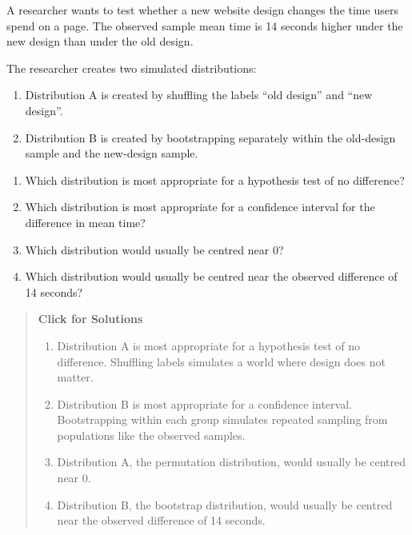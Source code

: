 \documentclass[
  letterpaper,
  DIV=11,
  numbers=noendperiod]{scrreprt}
\providecommand{\tightlist}{%
  \setlength{\itemsep}{0pt}\setlength{\parskip}{0pt}}
\begin{document}
\begin{tcolorbox}[enhanced jigsaw, arc=.35mm, bottomrule=.15mm, bottomtitle=1mm, breakable, colback=white, colbacktitle=quarto-callout-note-color!10!white, colframe=quarto-callout-note-color-frame, coltitle=black, left=2mm, leftrule=.75mm, opacityback=0, opacitybacktitle=0.6, rightrule=.15mm, title=\textcolor{quarto-callout-note-color}{\faInfo}\hspace{0.5em}{Question 6}, titlerule=0mm, toprule=.15mm, toptitle=1mm]

A researcher wants to test whether a new website design changes the time
users spend on a page. The observed sample mean time is 14 seconds
higher under the new design than under the old design.

The researcher creates two simulated distributions:

\begin{enumerate}
\def\labelenumi{\arabic{enumi}.}
\tightlist
\item
  Distribution A is created by shuffling the labels ``old design'' and
  ``new design''.
\item
  Distribution B is created by bootstrapping separately within the
  old-design sample and the new-design sample.
\end{enumerate}

\begin{enumerate}
\def\labelenumi{(\alph{enumi})}
\item
  Which distribution is most appropriate for a hypothesis test of no
  difference?
\item
  Which distribution is most appropriate for a confidence interval for
  the difference in mean time?
\item
  Which distribution would usually be centred near 0?
\item
  Which distribution would usually be centred near the observed
  difference of 14 seconds?
\end{enumerate}

\begin{quote}
\textbf{Click for Solutions}

\begin{enumerate}
\def\labelenumi{(\alph{enumi})}
\item
  Distribution A is most appropriate for a hypothesis test of no
  difference. Shuffling labels simulates a world where design does not
  matter.
\item
  Distribution B is most appropriate for a confidence interval.
  Bootstrapping within each group simulates repeated sampling from
  populations like the observed samples.
\item
  Distribution A, the permutation distribution, would usually be centred
  near 0.
\item
  Distribution B, the bootstrap distribution, would usually be centred
  near the observed difference of 14 seconds.
\end{enumerate}
\end{quote}

\end{tcolorbox}
\end{document}
